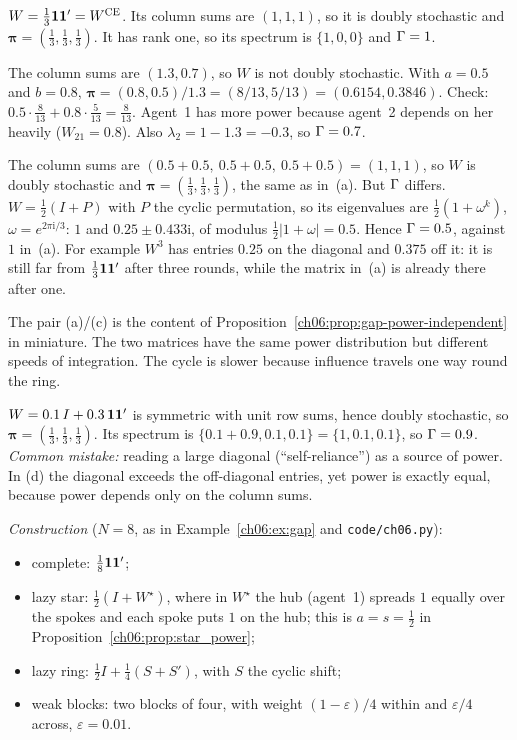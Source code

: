 \documentclass[../solutions_manual.tex]{subfiles}
\begin{document}
 $W = \frac13\mathbf{1}\mathbf{1}' = W^{\text{CE}}$. Its column sums are $(1,1,1)$, so it is doubly stochastic and $\boldsymbol{\pi} = (\frac13,\frac13,\frac13)$. It has rank one, so its spectrum is $\{1, 0, 0\}$ and $\Gamma = 1$.

 The column sums are $(1.3, 0.7)$, so $W$ is not doubly stochastic. With $a = 0.5$ and $b = 0.8$, $\boldsymbol{\pi} = (0.8, 0.5)/1.3 = (8/13, 5/13) = (0.6154, 0.3846)$. Check: $0.5\cdot\frac{8}{13} + 0.8\cdot\frac{5}{13} = \frac{8}{13}$. Agent~1 has more power because agent~2 depends on her heavily ($W_{21} = 0.8$). Also $\lambda_2 = 1 - 1.3 = -0.3$, so $\Gamma = 0.7$.

 The column sums are $(0.5 + 0.5,\ 0.5 + 0.5,\ 0.5 + 0.5) = (1,1,1)$, so $W$ is doubly stochastic and $\boldsymbol{\pi} = (\frac13, \frac13, \frac13)$, the same as in~(a). But $\Gamma$ differs. $W = \frac12(I + P)$ with $P$ the cyclic permutation, so its eigenvalues are $\frac12(1 + \omega^k)$, $\omega = e^{2\pi\mathrm{i}/3}$: $1$ and $0.25 \pm 0.433\mathrm{i}$, of modulus $\frac12|1 + \omega| = 0.5$. Hence $\Gamma = 0.5$, against $1$ in~(a). For example $W^3$ has entries $0.25$ on the diagonal and $0.375$ off it: it is still far from $\frac13\mathbf{1}\mathbf{1}'$ after three rounds, while the matrix in~(a) is already there after one.

The pair (a)/(c) is the content of Proposition~\ref{ch06:prop:gap-power-independent} in miniature. The two matrices have the same power distribution but different speeds of integration. The cycle is slower because influence travels one way round the ring.

 $W = 0.1\,I + 0.3\,\mathbf{1}\mathbf{1}'$ is symmetric with unit row sums, hence doubly stochastic, so $\boldsymbol{\pi} = (\frac13, \frac13, \frac13)$. Its spectrum is $\{0.1 + 0.9, 0.1, 0.1\} = \{1, 0.1, 0.1\}$, so $\Gamma = 0.9$. \emph{Common mistake:} reading a large diagonal (``self-reliance'') as a source of power. In (d) the diagonal exceeds the off-diagonal entries, yet power is exactly equal, because power depends only on the column sums.


\emph{Construction} ($N = 8$, as in Example~\ref{ch06:ex:gap} and \texttt{code/ch06.py}):
\begin{itemize}
\item complete: $\frac18\mathbf{1}\mathbf{1}'$;
\item lazy star: $\frac12(I + W^{\star})$, where in $W^{\star}$ the hub (agent~1) spreads $1$ equally over the spokes and each spoke puts $1$ on the hub; this is $a = s = \frac12$ in Proposition~\ref{ch06:prop:star_power};
\item lazy ring: $\frac12 I + \frac14(S + S')$, with $S$ the cyclic shift;
\item weak blocks: two blocks of four, with weight $(1-\varepsilon)/4$ within and $\varepsilon/4$ across, $\varepsilon = 0.01$.
\end{itemize}
\end{document}
